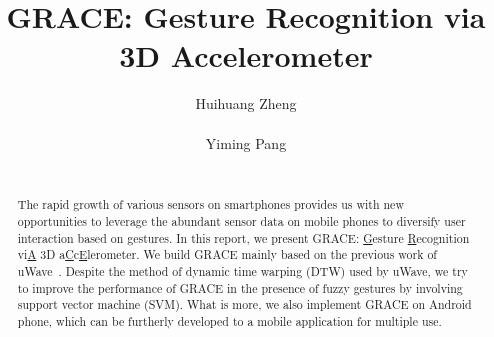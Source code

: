 \documentclass{acm_proc_article-sp}
\begin{document}
\title{GRACE: Gesture Recognition via 3D Accelerometer}


%
%
%
%
%

%
\author{
%
%
\alignauthor
Huihuang Zheng\\
       \\
\alignauthor
Yiming Pang\\
       \\
}


\maketitle
\begin{abstract}
The rapid growth of various sensors on smartphones provides us with new opportunities to leverage the abundant sensor data on mobile phones to diversify user interaction based on gestures. In this report, we present GRACE: \underline{G}esture \underline{R}ecognition vi\underline{A} 3D a\underline{C}c\underline{E}lerometer. We build GRACE mainly based on the previous work of uWave~\cite{liu2009uwave}. Despite the method of dynamic time warping (DTW) used by uWave, we try to improve the performance of GRACE in the presence of fuzzy gestures by involving support vector machine (SVM). What is more, we also implement GRACE on Android phone, which can be furtherly developed to a mobile application for multiple use.
\end{abstract}
\end{document}
